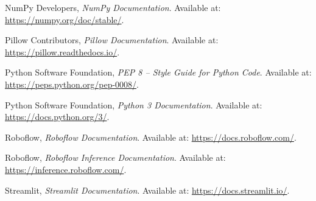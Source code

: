 \documentclass[a4paper,13pt]{extarticle}
\begin{document}
\noindent [1] NumPy Developers, \textit{NumPy Documentation}.
Available at: \url{https://numpy.org/doc/stable/}.

\noindent [2] Pillow Contributors, \textit{Pillow Documentation}.
Available at: \url{https://pillow.readthedocs.io/}.

\noindent [3] Python Software Foundation,
\textit{PEP 8 -- Style Guide for Python Code}.
Available at: \url{https://peps.python.org/pep-0008/}.

\noindent [4] Python Software Foundation,
\textit{Python 3 Documentation}.
Available at: \url{https://docs.python.org/3/}.

\noindent [5] Roboflow, \textit{Roboflow Documentation}.
Available at: \url{https://docs.roboflow.com/}.

\noindent [6] Roboflow, \textit{Roboflow Inference Documentation}.
Available at: \url{https://inference.roboflow.com/}.

\noindent [7] Streamlit, \textit{Streamlit Documentation}.
Available at: \url{https://docs.streamlit.io/}.
\end{document}
